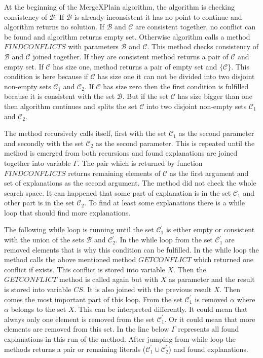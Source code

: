 \documentclass[12pt,a4paper]{article}
\begin{document}
At the beginning of the MergeXPlain algorithm, the algorithm is checking consistency of $\mathcal{B}$. If $\mathcal{B}$ is already inconsistent it has no point to continue and algorithm returns no solution. If $\mathcal{B}$ and $\mathcal{C}$ are consistent together, no conflict can be found and algorithm returns empty set. Otherwise algorithm calls a method $\mathit{FINDCONFLICTS}$ with parameters $\mathcal{B}$ and $\mathcal{C}$. This method checks consistency of $\mathcal{B}$ and $\mathcal{C}$ joined together. If they are consistent method returns a pair of $\mathcal{C}$ and empty set. If $\mathcal{C}$ has size one, method returns a pair of empty set and $\{ \mathcal{C} \}$. This condition is here because if $\mathcal{C}$ has size one it can not be divided into two disjoint non-empty sets $\mathcal{C}_{1}$ and $\mathcal{C}_{2}$. If $\mathcal{C}$ has size zero then the first condition is fulfilled because it is consistent with the set $\mathcal{B}$. But if the set $\mathcal{C}$ has size bigger than one then algorithm continues and splits the set $\mathcal{C}$ into two disjoint non-empty sets $\mathcal{C}_{1}$ and $\mathcal{C}_{2}$. 

The method recursively calls itself, first with the set $\mathcal{C}_{1}$ as the second parameter and secondly with the set $\mathcal{C}_{2}$ as the second parameter. This is repeated until the method is emerged from both recursions and found explanations are joined together into variable $\Gamma$. The pair which is returned by function $\mathit{FINDCONFLICTS}$ returns remaining elements of $\mathcal{C}$ as the first argument and set of explanations as the second argument. The method did not check the whole search space. It can happened that some part of explanation is in the set $\mathcal{C}_{1}$ and other part is in the set $\mathcal{C}_{2}$. To find at least some explanations there is a while loop that should find more explanations. 

The following while loop is running until the set $\mathcal{C}^{\prime}_{1}$ is either empty or consistent with the union of the sets $\mathcal{B}$ and $\mathcal{C}^{\prime}_{2}$. In the while loop from the set $\mathcal{C}^{\prime}_{1}$ are removed elements that is why this condition can be fulfilled. In the while loop the method calls the above mentioned method $\mathit{GETCONFLICT}$ which returned one conflict if exists. This conflict is stored into variable $X$. Then the $\mathit{GETCONFLICT}$ method is called again but with $X$ as parameter and the result is stored into variable $CS$. It is also joined with the previous result $X$. Then comes the most important part of this loop. From the set $\mathcal{C}^{\prime}_{1}$ is removed $\alpha$ where $\alpha$ belongs to the set $X$. This can be interpreted differently. It could mean that always only one element is removed from the set $\mathcal{C}^{\prime}_{1}$. Or it could mean that more elements are removed from this set. In the line below $\Gamma$ represents all found explanations in this run of the method. After jumping from while loop the methods returns a pair or remaining literals ($\mathcal{C}^{\prime}_{1} \cup \mathcal{C}^{\prime}_{2}$) and found explanations.
\end{document}
